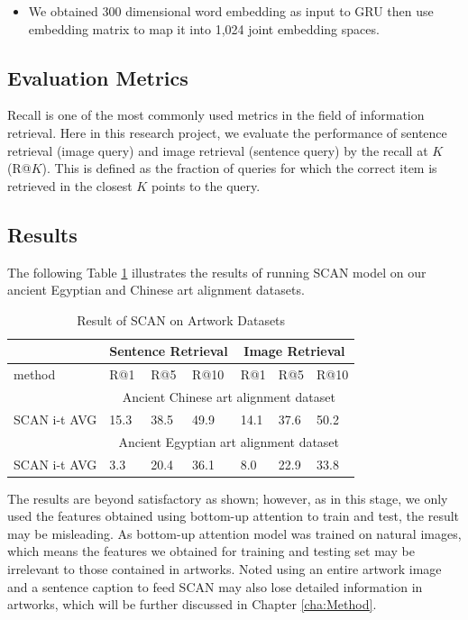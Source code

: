 \begin{itemize}
    \item We obtained 300 dimensional word embedding as input to GRU then use embedding matrix to map it into 1,024 joint embedding spaces.
\end{itemize}

\subsection{Evaluation Metrics}

Recall is one of the most commonly used metrics in the field of information retrieval. Here in this research project, we evaluate the performance of sentence retrieval (image query) and image retrieval (sentence query) by the recall at $K$ (R@$K$). This is defined as the fraction of queries for which the correct item is retrieved in the closest $K$ points to the query. 

\subsection{Results}

The following Table \ref{table:resultscan} illustrates the results of running SCAN model on our ancient Egyptian and Chinese art alignment datasets.

\begin{table}[h!]
\centering
\begin{tabular}{lllllll}
                       & \multicolumn{3}{c}{Sentence Retrieval} & \multicolumn{3}{c}{Image Retrieval} \\ \hline
method                 & R@1         & R@5         & R@10       & R@1        & R@5        & R@10      \\ \hline
\multicolumn{1}{r}{}   & \multicolumn{6}{c}{Ancient Chinese art alignment dataset}                   \\ \hline
SCAN i-t AVG & 15.3        & 38.5        & 49.9       & 14.1       & 37.6       & 50.2      \\ \hline
\multicolumn{1}{r}{}   & \multicolumn{6}{c}{Ancient Egyptian art alignment dataset}                    \\ \hline
SCAN i-t AVG & 3.3         & 20.4        & 36.1       & 8.0        & 22.9       & 33.8     
\end{tabular}
\caption{Result of SCAN on Artwork Datasets}
\label{table:resultscan}
\end{table}

The results are beyond satisfactory as shown; however, as in this stage, we only used the features obtained using bottom-up attention \cite{bottomup} to train and test, the result may be misleading. As bottom-up attention model was trained on natural images, which means the features we obtained for training and testing set may be irrelevant to those contained in artworks. Noted using an entire artwork image and a sentence caption to feed SCAN may also lose detailed information in artworks, which will be further discussed in Chapter \ref{cha:Method}.


